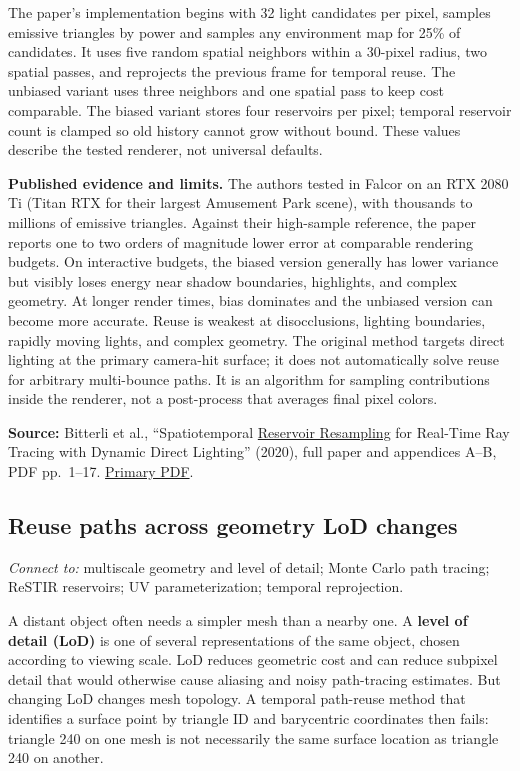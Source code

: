 The paper's implementation begins with 32 light candidates per pixel, samples emissive triangles by power and samples any environment map for 25\% of candidates. It uses five random spatial neighbors within a 30-pixel radius, two spatial passes, and reprojects the previous frame for temporal reuse. The unbiased variant uses three neighbors and one spatial pass to keep cost comparable. The biased variant stores four reservoirs per pixel; temporal reservoir count is clamped so old history cannot grow without bound. These values describe the tested renderer, not universal defaults.

\textbf{Published evidence and limits.} The authors tested in Falcor on an RTX 2080 Ti (Titan RTX for their largest Amusement Park scene), with thousands to millions of emissive triangles. Against their high-sample reference, the paper reports one to two orders of magnitude lower error at comparable rendering budgets. On interactive budgets, the biased version generally has lower variance but visibly loses energy near shadow boundaries, highlights, and complex geometry. At longer render times, bias dominates and the unbiased version can become more accurate. Reuse is weakest at disocclusions, lighting boundaries, rapidly moving lights, and complex geometry. The original method targets direct lighting at the primary camera-hit surface; it does not automatically solve reuse for arbitrary multi-bounce paths. It is an algorithm for sampling contributions inside the renderer, not a post-process that averages final pixel colors.

\textbf{Source:} Bitterli et al., ``Spatiotemporal \hyperref[appendix-68be451b78b1]{Reservoir Resampling} for Real-Time Ray Tracing with Dynamic Direct Lighting'' (2020), full paper and appendices A--B, PDF pp.~1--17. \href{https://benedikt-bitterli.me/restir/bitterli20restir.pdf}{Primary PDF}.

\subsection{Reuse paths across geometry LoD changes}\label{03-visual-computing-i-ch012-reuse-paths-across-geometry-lod-changes}

\emph{Connect to:} multiscale geometry and level of detail; Monte Carlo path tracing; ReSTIR reservoirs; UV parameterization; temporal reprojection.

A distant object often needs a simpler mesh than a nearby one. A \textbf{level of detail (LoD)} is one of several representations of the same object, chosen according to viewing scale. LoD reduces geometric cost and can reduce subpixel detail that would otherwise cause aliasing and noisy path-tracing estimates. But changing LoD changes mesh topology. A temporal path-reuse method that identifies a surface point by triangle ID and barycentric coordinates then fails: triangle 240 on one mesh is not necessarily the same surface location as triangle 240 on another.

